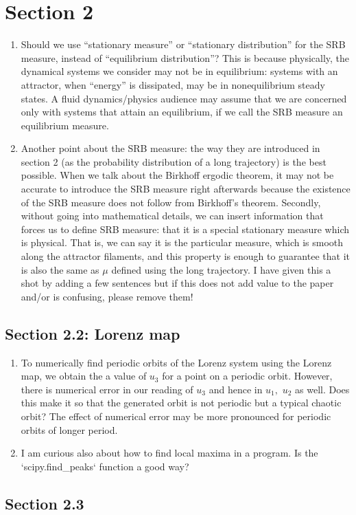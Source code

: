 \documentclass[12pt]{article}
\begin{document}
\section*{Section 2}
\begin{enumerate}
    \item Should we use ``stationary measure'' or ``stationary distribution'' for the SRB measure, instead of ``equilibrium distribution''? This is because physically, the dynamical systems we consider may not be in equilibrium: systems with an attractor, when ``energy'' is dissipated, may be in nonequilibrium steady states. A fluid dynamics/physics audience may assume that we are concerned only with systems that attain an equilibrium, if we call the SRB measure 
    an equilibrium measure.
    \item Another point about the SRB measure: the way they are introduced in section 2 (as the probability distribution of a long trajectory) is the best possible. When we talk about the Birkhoff ergodic theorem, it may not be accurate to introduce the SRB measure right afterwards because the existence of the SRB measure does not follow from Birkhoff's theorem. Secondly, without going into mathematical details, we can insert information that forces us to define SRB measure: that it is a special stationary measure which is physical. That is, we can say it is the particular measure, which is smooth along the attractor filaments, and this property is enough to guarantee that it is also the same as $\mu$ defined using the long trajectory. I have given this a shot by adding a few sentences but if this does not add value to the paper and/or is confusing, please remove them!
\end{enumerate}
\subsection*{Section 2.2: Lorenz map}
\begin{enumerate}
    \item To numerically find periodic orbits of the Lorenz system using the Lorenz map, we obtain the a value of $u_3$ for a point on a periodic orbit. However, there is numerical error in our reading of $u_3$ and hence in $u_1,$ $u_2$ as well. Does this make it so that the generated orbit is not periodic but a typical chaotic orbit? The effect of numerical error may be more pronounced for periodic orbits of longer period.  
    \item I am curious also about how to find local maxima in a program. Is the `scipy.find\_peaks` function a good way?
\end{enumerate} 
\subsection*{Section 2.3}
\end{document}
